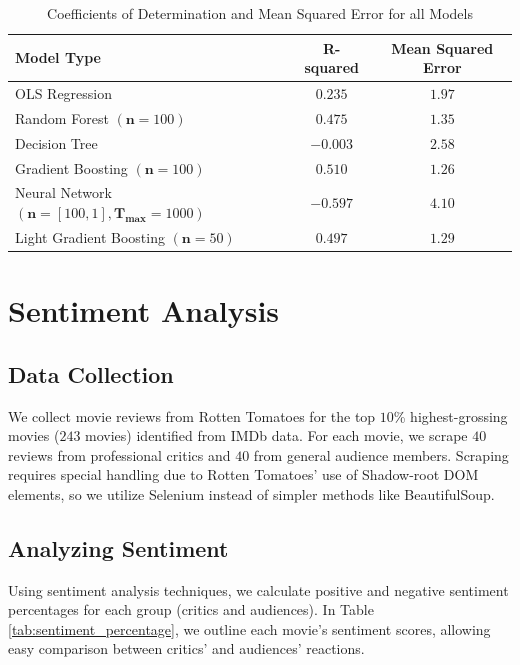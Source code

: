 \documentclass{article}
\begin{document}
\begin{table}[H]
    \centering
    \caption{Coefficients of Determination and Mean Squared Error for all Models}
    \begin{tabular}{lcc}
        \toprule
        \textbf{Model Type} & \textbf{R-squared} & \textbf{Mean Squared Error} \\
        \midrule
        OLS Regression & $0.235$ & $1.97$ \\
        Random Forest $(\mathbf{n}=100)$ & $0.475$ & $1.35$ \\
        Decision Tree  & $-0.003$ & $2.58$ \\
        Gradient Boosting $(\mathbf{n}=100)$ & $0.510$ & $1.26$ \\
        Neural Network $(\mathbf{n}=[100,1], \mathbf{T_{max}}=1000)$ & $-0.597$ & $4.10$ \\
        Light Gradient Boosting $(\mathbf{n}=50)$ & $0.497$ & $1.29$ \\
        \bottomrule
    \end{tabular}
    \label{tab:model_results}
\end{table}


\section{Sentiment Analysis}
\subsection{Data Collection}
We collect movie reviews from Rotten Tomatoes for the top $10$\% highest-grossing movies ($243$ movies) identified from IMDb data. For each movie, we scrape $40$ reviews from professional critics and $40$ from general audience members. Scraping requires special handling due to Rotten Tomatoes' use of Shadow-root DOM elements, so we utilize Selenium instead of simpler methods like BeautifulSoup.

\subsection{Analyzing Sentiment}
Using sentiment analysis techniques, we calculate positive and negative sentiment percentages for each group (critics and audiences). In Table \ref{tab:sentiment_percentage}, we outline each movie’s sentiment scores, allowing easy comparison between critics' and audiences' reactions.
\end{document}
